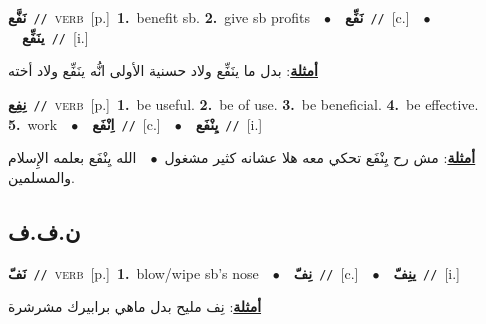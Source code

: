\documentclass[10pt,a4paper,twoside]{article} %
\begin{document}
\begin{multicols}{2}
{\setlength\topsep{0pt}\textbf{\foreignlanguage{arabic}{نَفَّع}}\ {\color{gray}\texttt{//}\color{black}}\ \textsc{verb}\ [p.]\ \textbf{1.}~benefit sb.  \textbf{2.}~give sb profits\ \ $\bullet$\ \ \setlength\topsep{0pt}\textbf{\foreignlanguage{arabic}{نَفِّع}}\ {\color{gray}\texttt{//}\color{black}}\ [c.]\ \ $\bullet$\ \ \setlength\topsep{0pt}\textbf{\foreignlanguage{arabic}{ينَفِّع}}\ {\color{gray}\texttt{//}\color{black}}\ [i.]\  \begin{flushright}\color{gray}\foreignlanguage{arabic}{\textbf{\underline{\foreignlanguage{arabic}{أمثلة}}}: بدل ما ينَفِّع ولاد حسنية الأولى انُّه ينَفِّع ولاد أخته}\end{flushright}\color{black}} \vspace{2mm}

{\setlength\topsep{0pt}\textbf{\foreignlanguage{arabic}{نِفِع}}\ {\color{gray}\texttt{//}\color{black}}\ \textsc{verb}\ [p.]\ \textbf{1.}~be useful.  \textbf{2.}~be of use.  \textbf{3.}~be beneficial.  \textbf{4.}~be effective.  \textbf{5.}~work\ \ $\bullet$\ \ \setlength\topsep{0pt}\textbf{\foreignlanguage{arabic}{اِنْفَع}}\ {\color{gray}\texttt{//}\color{black}}\ [c.]\ \ $\bullet$\ \ \setlength\topsep{0pt}\textbf{\foreignlanguage{arabic}{يِنْفَع}}\ {\color{gray}\texttt{//}\color{black}}\ [i.]\  \begin{flushright}\color{gray}\foreignlanguage{arabic}{\textbf{\underline{\foreignlanguage{arabic}{أمثلة}}}: مش رح يِنْفَع تحكي معه هلا عشانه كثير مشغول\ $\bullet$\ \  الله يِنْفَع بعلمه الإِسلام والمسلمين.}\end{flushright}\color{black}} \vspace{2mm}

\vspace{-3mm}
\subsection*{\color{blue}\foreignlanguage{arabic}{ن.ف.ف}\color{blue}{}} 

{\setlength\topsep{0pt}\textbf{\foreignlanguage{arabic}{نَفّ}}\ {\color{gray}\texttt{//}\color{black}}\ \textsc{verb}\ [p.]\ \textbf{1.}~blow/wipe sb's nose\ \ $\bullet$\ \ \setlength\topsep{0pt}\textbf{\foreignlanguage{arabic}{نِفّ}}\ {\color{gray}\texttt{//}\color{black}}\ [c.]\ \ $\bullet$\ \ \setlength\topsep{0pt}\textbf{\foreignlanguage{arabic}{ينِفّ}}\ {\color{gray}\texttt{//}\color{black}}\ [i.]\  \begin{flushright}\color{gray}\foreignlanguage{arabic}{\textbf{\underline{\foreignlanguage{arabic}{أمثلة}}}: نِف مليح بدل ماهي برابيرك مشرشرة}\end{flushright}\color{black}} \vspace{2mm}


\end{multicols}
\end{document}

